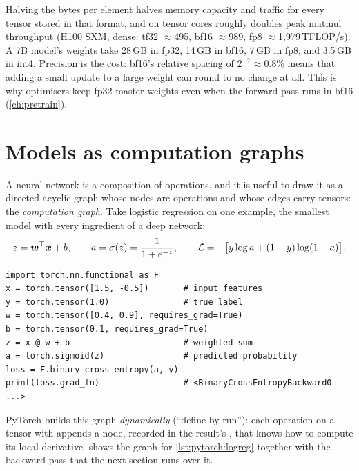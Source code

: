 \begin{napkinmath}
Halving the bytes per element halves memory capacity and traffic for every tensor stored in that format,
and on tensor cores roughly doubles peak matmul throughput (H100 SXM, dense: tf32 $\approx$495, bf16 $\approx$989,
fp8 $\approx$1{,}979\,TFLOP/s). A 7B model's weights take 28\,GB in fp32, 14\,GB in bf16, 7\,GB in fp8, and
3.5\,GB in int4. Precision is the cost: bf16's relative spacing of $2^{-7}\approx0.8\%$ means that adding a
small update to a large weight can round to no change at all. This is why optimisers keep fp32 master
weights even when the forward pass runs in bf16 (\cref{ch:pretrain}).
\end{napkinmath}

\section{Models as computation graphs}\label{sec:pytorch:graphs}

A neural network is a composition of operations, and it is useful to draw it as a directed acyclic graph
whose nodes are operations and whose edges carry tensors: the \emph{computation graph}. Take logistic
regression on one example, the smallest model with every ingredient of a deep network:
\begin{equation}
z = \bm{w}^\top\bm{x} + b,\qquad a = \sigma(z) = \frac{1}{1+e^{-z}},\qquad
\mathcal{L} = -\bigl[y\log a + (1-y)\log(1-a)\bigr].
\end{equation}

\begin{lstlisting}[caption={Logistic regression forward pass; autograd records the graph as it runs.},label={lst:pytorch:logreg}]
import torch.nn.functional as F
x = torch.tensor([1.5, -0.5])       # input features
y = torch.tensor(1.0)               # true label
w = torch.tensor([0.4, 0.9], requires_grad=True)
b = torch.tensor(0.1, requires_grad=True)
z = x @ w + b                       # weighted sum
a = torch.sigmoid(z)                # predicted probability
loss = F.binary_cross_entropy(a, y)
print(loss.grad_fn)                 # <BinaryCrossEntropyBackward0 ...>
\end{lstlisting}

PyTorch builds this graph \emph{dynamically} (``define-by-run''): each operation on a tensor with
 appends a node, recorded in the result's , that knows how to compute
its local derivative.  shows the graph for \cref{lst:pytorch:logreg} together with
the backward pass that the next section runs over it.

